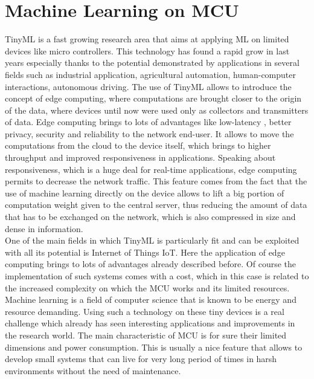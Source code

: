 \documentclass[12pt]{report}
\begin{document}
\section{Machine Learning on MCU}
TinyML is a fast growing research area that aims at applying ML on limited devices like micro controllers. This technology has found a rapid grow in last years especially thanks to the potential demonstrated by applications in several fields such as industrial application, agricultural automation, human-computer interactions, autonomous driving. The use of TinyML allows to introduce the concept of edge computing, where computations are brought closer to the origin of the data, where devices until now were used only as collectors and transmitters of data. Edge computing brings to lots of advantages like low-latency , better privacy, security and reliability to the network end-user. It allows to move the computations from the cloud to the device itself, which brings to higher throughput and improved responsiveness in applications. Speaking about responsiveness, which is a huge deal for real-time applications, edge computing permits to decrease the network traffic. This feature comes from the fact that the use of machine learning directly on the device allows to lift a big portion of computation weight given to the central server, thus reducing the amount of data that has to be exchanged on the network, which is also compressed in size and dense in information. \\
One of the main fields in which TinyML is particularly fit and can be exploited with all its potential is Internet of Things IoT. Here the application of edge computing brings to lots of advantages already described before. Of course the implementation of such systems comes with a cost, which in this case is related to the increased complexity on which the MCU works and its limited resources. Machine learning is a field of computer science that is known to be energy and resource demanding. Using such a technology on these tiny devices is a real challenge which already has seen interesting applications and improvements in the research world. The main characteristic of MCU is for sure their limited dimensions and power consumption. This is usually a nice feature that allows to develop small systems that can live for very long period of times in harsh environments without the need of maintenance. 
\end{document}
